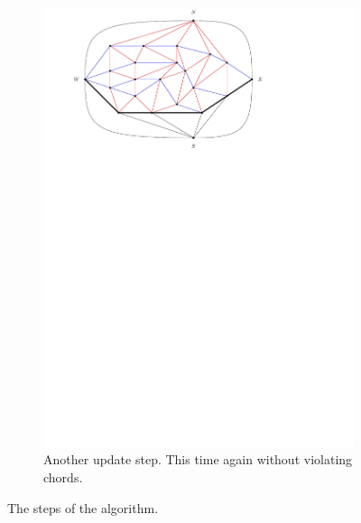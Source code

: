 \begin{figure}
\begin{subfigure}[b]{.9 \textwidth}
      \includegraphics[width=\textwidth]{examples/img/smallExample/smallExample-6}
      \caption{Another update step. This time again without violating chords.}
      \label{fig:ex:simple:6}
    \end{subfigure}
    \caption{The steps of the algorithm.}
\end{figure}

